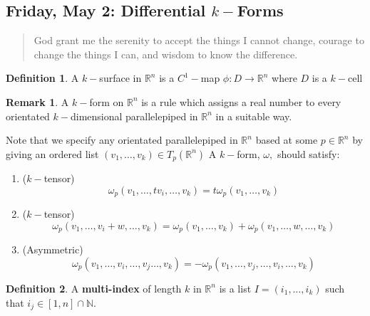 \documentclass[10pt, oneside]{article}
\newcommand{\bbR}{\mathbb{R}}
\newcommand{\bbN}{\mathbb{N}}
\theoremstyle{definition}
\newtheorem{defn}{Definition}
\newtheorem{rem}{Remark}
\begin{document}
\newpage
\subsection{Friday, May 2: Differential $k-$Forms}
\begin{quote}
    God grant me the serenity to accept the things I cannot change, courage to change the things I can, and wisdom to know the difference.
\end{quote}
\begin{defn}
    A $k-$surface in $\bbR^n$ is a $C^1-$map $\phi: D \to \bbR^n$ where $D$ is a $k-$cell
\end{defn}
\begin{rem}
    A $k-$form on $\bbR^n$ is a rule which assigns a real number to every orientated $k-$dimensional parallelepiped in $\bbR^n$ in a suitable way.

Note that we specify any orientated parallelepiped in $\bbR^n$ based at some $p \in \bbR^n$ by giving an ordered list $(v_1, \dots, v_k) \in T_p(\bbR^n)$ A $k-$form, $\omega,$ should satisfy:
\begin{enumerate}
    \item ($k-$tensor) \[\omega_p(v_1, \dots, tv_i, \dots, v_k) = t\omega_p(v_1, \dots, v_k)\]
    \item ($k-$tensor) \[\omega_p(v_1, \dots, v_i + w, \dots, v_k) = \omega_p(v_1, \dots, v_k) + \omega_p(v_1, \dots, w, \dots, v_k)\]
    \item (Asymmetric)
    \[\omega_p(v_1, \dots, v_i, \dots, v_j\dots, v_k) = -\omega_p(v_1, \dots, v_j, \dots, v_i,\dots, v_k)\]
\end{enumerate}
\end{rem}

\begin{defn}
    A \textbf{multi-index} of length $k$ in $\bbR^n$ is a list $I = (i_1, \dots, i_k)$ such that $i_j \in [1,n] \cap \bbN.$ 
\end{defn}
\end{document}
